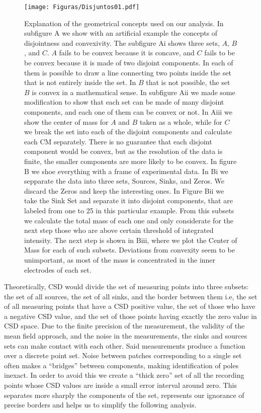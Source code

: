 \documentclass{article}
\begin{document}
\begin{figure}
  \texttt{[image: Figuras/Disjuntos01.pdf]}
  \caption{ Explanation of the geometrical concepts used on our analysis. In subfigure A we show
    with an artificial example the concepts of disjointness and convexivity. The subfigure Ai shows
    three sets, $A$, $B$, and $C$. $A$ fails to be convex because it is concave, and $C$ fails to be
    be convex because it is made of two disjoint components. In each of them is possible to draw a line
    connecting two points inside the set that is not entirely inside the set. In $B$ that is not possible, the set $B$ is convex in a mathematical sense. In subfigure Aii we made some modification to show that
    each set can be made of many disjoint components, and each one of them can be convex or not.  In Aiii we show the center of mass for $A$ and $B$ taken as a whole, while for $C$ we break the set into each of the disjoint components and calculate each CM separately. There is no guarantee that each disjoint component would be convex, but as the resolution of the data is finite, the smaller components are more likely to
    be convex. In figure B we shoe everything with a frame of experimental data. In Bi we sepparate the
    data into three sets, Sources, Sinks, and Zeros. We discard the Zeros and keep the interesting ones.
    In Figure Bii we take the Sink Set and separate it into disjoint components, that are labeled from one to 25 in this particular example. From this subsets we calculate the total mass of each one and only
    considerate for the next step those who are above certain threshold of integrated intensity. The
    next step is shown in Biii, where we plot the Center of Mass for each of such subsets. Deviations
    from convexity seem to be unimportant, as most of the mass is concentrated in the inner electrodes
    of each set.
  }
  \label{disjuntos}
\end{figure}

Theoretically, CSD would divide the set of measuring points into three subsets: the set of all sources, the set of all sinks, and the border between them i.e, the set of all measuring points that have a CSD positive value, the set of those who have a negative CSD value, and the set of those points having exactly the zero value in CSD space.
Due to the finite precision of the measurement, the validity of the mean field approach, and the noise in the measurements, the sinks and sources sets can make contact with each other. Said measurements produce a function over a discrete point set. Noise between patches corresponding to a single set often makes a ``bridges'' between components, making identification of poles inexact. In order to avoid this we create a ``thick zero'' set of all the recording points whose CSD values are inside a small error interval around zero. This separates more sharply the components of the set, represents our ignorance of precise borders and helps us to simplify the following analysis.
\end{document}
